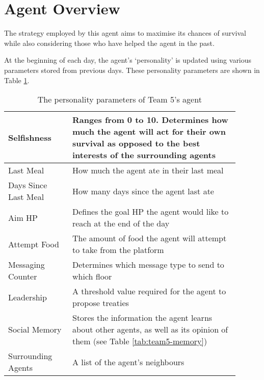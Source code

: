 \section{Agent Overview}
\label{sec:team5-overview}


The strategy employed by this agent aims to maximise its chances of survival while also considering those who have helped the agent in the past.

At the beginning of each day, the agent's `personality' is updated using various parameters stored from previous days. These personality parameters are shown in Table \ref{tab:team5-personality}.

\begin{table}
    \centering
\begin{tabular}%
    {| >{\raggedleft\arraybackslash}p{0.25\linewidth} | %
    >{\raggedright\arraybackslash}p{0.65\linewidth} | %
    }
    \hline
    Selfishness          & Ranges from 0 to 10. Determines how much the agent will act for their own survival as opposed to the best interests of the surrounding agents\\
    \hline
    Last Meal            & How much the agent ate in their last meal\\
    \hline
    Days Since Last Meal & How many days since the agent last ate\\
    \hline
    Aim HP               & Defines the goal HP the agent would like to reach at the end of the day\\
    \hline
    Attempt Food         & The amount of food the agent will attempt to take from the platform\\
    \hline
    Messaging Counter    & Determines which message type to send to which floor \\
    Leadership           & A threshold value required for the agent to propose treaties\\
    \hline
    Social Memory        & Stores the information the agent learns about other agents, as well as its opinion of them (see Table \ref{tab:team5-memory})\\
    \hline
    Surrounding Agents   & A list of the agent's neighbours\\
    \hline
\end{tabular}
\caption{The personality parameters of Team 5's agent}
\label{tab:team5-personality}
\end{table}

